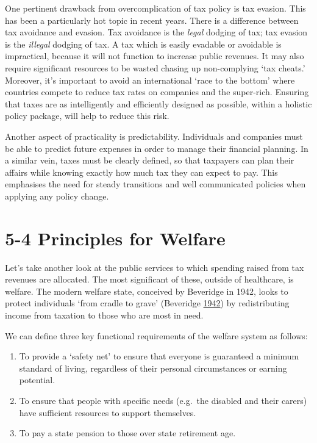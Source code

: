 \documentclass[]{tufte-handout}
\providecommand{\tightlist}{%
  \setlength{\itemsep}{0pt}\setlength{\parskip}{0pt}}
\begin{document}
One pertinent drawback from overcomplication of tax policy is tax
evasion. This has been a particularly hot topic in recent years. There
is a difference between tax avoidance and evasion. Tax avoidance is the
\emph{legal} dodging of tax; tax evasion is the \emph{illegal} dodging
of tax. A tax which is easily evadable or avoidable is impractical,
because it will not function to increase public revenues. It may also
require significant resources to be wasted chasing up non-complying `tax
cheats.' Moreover, it's important to avoid an international `race to the
bottom' where countries compete to reduce tax rates on companies and the
super-rich. Ensuring that taxes are as intelligently and efficiently
designed as possible, within a holistic policy package, will help to
reduce this risk.

Another aspect of practicality is predictability. Individuals and
companies must be able to predict future expenses in order to manage
their financial planning. In a similar vein, taxes must be clearly
defined, so that taxpayers can plan their affairs while knowing exactly
how much tax they can expect to pay. This emphasises the need for steady
transitions and well communicated policies when applying any policy
change.

\hypertarget{principles-for-welfare}{%
\section{5-4 Principles for Welfare}\label{principles-for-welfare}}

Let's take another look at the public services to which spending raised
from tax revenues are allocated. The most significant of these, outside
of healthcare, is welfare. The modern welfare state, conceived by
Beveridge in 1942, looks to protect individuals `from cradle to grave'
(Beveridge \protect\hyperlink{ref-Beveridge1942}{1942}) by
redistributing income from taxation to those who are most in need.

We can define three key functional requirements of the welfare system as
follows:

\begin{enumerate}
\def\labelenumi{\arabic{enumi}.}
\tightlist
\item
  To provide a `safety net' to ensure that everyone is guaranteed a
  minimum standard of living, regardless of their personal circumstances
  or earning potential.
\item
  To ensure that people with specific needs (e.g.~the disabled and their
  carers) have sufficient resources to support themselves.
\item
  To pay a state pension to those over state retirement age.
\end{enumerate}
\end{document}
